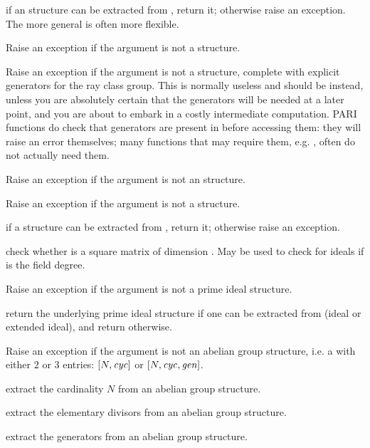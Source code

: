  if an  structure can be extracted from
, return it; otherwise raise an exception. The more general
 is often more flexible.

 Raise an exception if the argument
is not a  structure.

 Raise an exception if the argument is not a
 structure, complete with explicit generators for the ray class group.
This is normally useless and  should be instead, unless
you are absolutely certain that the generators will be needed at a later
point, and you are about to embark in a costly intermediate computation.
PARI functions do check that generators are present in  before
accessing them: they will raise an error themselves; many functions
that may require them, e.g. , often
do not actually need them.

 Raise an exception if the argument is not an
 structure.

 Raise an exception if the argument is not a
 structure.

 if a  structure can be extracted
from , return it; otherwise raise an exception.

 check whether  is a square matrix
of dimension . May be used to check for ideals if  is the field
degree.

 Raise an exception if the argument is not a
prime ideal structure.

 return the underlying prime ideal structure
if one can be extracted from  (ideal or extended ideal), and
return  otherwise.

 Raise an exception if the argument
is not an abelian group structure, i.e. a  with either $2$ or $3$
entries: $[N,\hbox{\it cyc\/}]$ or $[N,\hbox{\it cyc\/}, \hbox{\it gen\/}]$.

 extract the cardinality $N$ from an abelian group structure.

 extract the elementary divisors  from an abelian group structure.

 extract the generators  from an abelian group structure.

